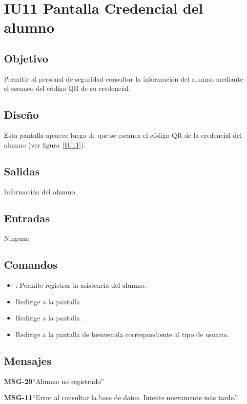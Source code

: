 \section{IU11 Pantalla Credencial del alumno}

\subsection{Objetivo}
	Permitir al personal de seguridad consultar la información del alumno mediante el escaneo del código QR de su credencial.

\subsection{Diseño}
Esta pantalla aparece luego de que se escanea el código QR de la credencial del alumno  (ver figura~\ref{IU11}).
	


\subsection{Salidas}
	Información del alumno

\subsection{Entradas}
Ninguna

\subsection{Comandos}
\begin{itemize}
	\item {}: Permite registrar la asistencia del alumno.
	\item {} Redirige a la pantalla .
    \item {} Redirige a la pantalla .
    \item {} Redirige a la pantalla de bienvenida correspondiente al tipo de usuario.
\end{itemize}

\subsection{Mensajes}

\begin{Citemize}
	\item {\bf MSG-20}{``Alumno no registrado''}
	\item {\bf MSG-11}{``Error al consultar la base de datos. Intente nuevamente más tarde.''}
\end{Citemize}

